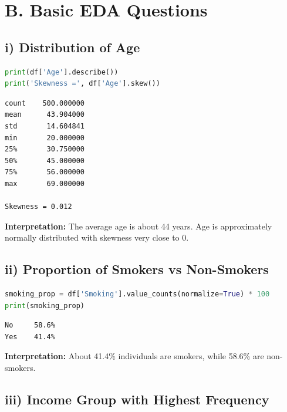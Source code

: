 \documentclass[12pt, a4paper]{article}
\begin{document}
\section*{B. Basic EDA Questions}

\subsection*{i) Distribution of Age}

\begin{lstlisting}[language=Python]
print(df['Age'].describe())
print('Skewness =', df['Age'].skew())
\end{lstlisting}

\begin{outputbox}
\begin{verbatim}
count    500.000000
mean      43.904000
std       14.604841
min       20.000000
25%       30.750000
50%       45.000000
75%       56.000000
max       69.000000

Skewness = 0.012
\end{verbatim}
\end{outputbox}

\textbf{\textcolor{RoyalNavy}{Interpretation:}} The average age is about 44 years. Age is approximately normally distributed with skewness very close to 0.

\subsection*{ii) Proportion of Smokers vs Non-Smokers}

\begin{lstlisting}[language=Python]
smoking_prop = df['Smoking'].value_counts(normalize=True) * 100
print(smoking_prop)
\end{lstlisting}

\begin{outputbox}
\begin{verbatim}
No     58.6%
Yes    41.4%
\end{verbatim}
\end{outputbox}

\textbf{\textcolor{RoyalNavy}{Interpretation:}} About 41.4\% individuals are smokers, while 58.6\% are non-smokers.

\subsection*{iii) Income Group with Highest Frequency}
\end{document}
